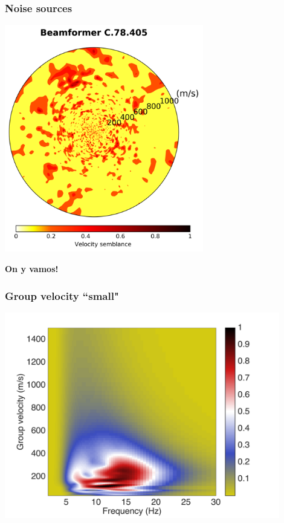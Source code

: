 \documentclass{beamer}
\begin{document}
\frame
{
\frametitle{{\bf Noise sources}}
\centering
\includegraphics[width=0.65\textwidth]{../pics/C-78-405/beamformer.png}
}
\frame
{
\centering
{\bf On y vamos!}
}
\frame
{
\frametitle{{\bf Group velocity ``small"}}
\centering
\includegraphics[width=0.9\textwidth]{../pics/C-26-78/group-velocity.png}
}
\end{document}
